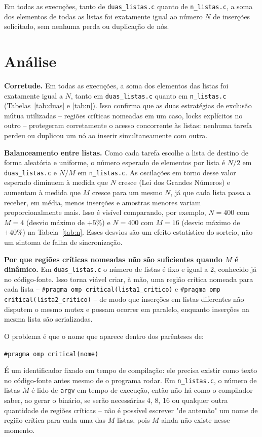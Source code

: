 \documentclass[a4paper,12pt]{article}
\begin{document}
Em todas as execuções, tanto de \texttt{duas\_listas.c} quanto de \texttt{n\_listas.c}, a soma dos elementos de todas as listas foi exatamente igual ao número $N$ de inserções solicitado, sem nenhuma perda ou duplicação de nós.

\section{Análise}

\textbf{Corretude.} Em todas as execuções, a soma dos elementos das listas foi exatamente igual a $N$, tanto em \texttt{duas\_listas.c} quanto em \texttt{n\_listas.c} (Tabelas~\ref{tab:duas} e \ref{tab:n}). Isso confirma que as duas estratégias de exclusão mútua utilizadas -- regiões críticas nomeadas em um caso, locks explícitos no outro -- protegeram corretamente o acesso concorrente às listas: nenhuma tarefa perdeu ou duplicou um nó ao inserir simultaneamente com outra.

\textbf{Balanceamento entre listas.} Como cada tarefa escolhe a lista de destino de forma aleatória e uniforme, o número esperado de elementos por lista é $N/2$ em \texttt{duas\_listas.c} e $N/M$ em \texttt{n\_listas.c}. As oscilações em torno desse valor esperado diminuem à medida que $N$ cresce (Lei dos Grandes Números) e aumentam à medida que $M$ cresce para um mesmo $N$, já que cada lista passa a receber, em média, menos inserções e amostras menores variam proporcionalmente mais. Isso é visível comparando, por exemplo, $N=400$ com $M=4$ (desvio máximo de $+5\%$) e $N=400$ com $M=16$ (desvio máximo de $+40\%$) na Tabela~\ref{tab:n}. Esses desvios são um efeito estatístico do sorteio, não um sintoma de falha de sincronização.

\textbf{Por que regiões críticas nomeadas não são suficientes quando $M$ é dinâmico.} Em \texttt{duas\_listas.c} o número de listas é fixo e igual a 2, conhecido já no código-fonte. Isso torna viável criar, à mão, uma região crítica nomeada para cada lista -- \texttt{\#pragma omp critical(lista1\_critico)} e \texttt{\#pragma omp critical(lista2\_critico)} -- de modo que inserções em listas diferentes não disputem o mesmo mutex e possam ocorrer em paralelo, enquanto inserções na mesma lista são serializadas.

O problema é que o nome que aparece dentro dos parênteses de:

\texttt{\#pragma omp critical(nome)} 

É um identificador fixado em tempo de compilação: ele precisa existir como texto no 
código-fonte antes mesmo de o programa rodar. Em \texttt{n\_listas.c}, 
o número de listas $M$ é lido de \texttt{argv} em tempo de execução, 
então não há como o compilador saber, ao gerar o binário, se serão 
necessárias 4, 8, 16 ou qualquer outra quantidade de regiões críticas -- 
não é possível escrever "de antemão" um nome de região crítica para cada 
uma das $M$ listas, pois $M$ ainda não existe nesse momento.
\end{document}
